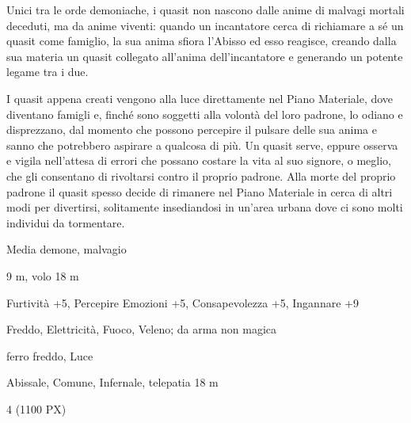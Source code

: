 \begin{multicols}{2}
{Unici tra le orde demoniache, i quasit non nascono dalle anime di malvagi mortali deceduti, ma da anime viventi: quando un incantatore cerca di richiamare a sé un quasit come famiglio, la sua anima sfiora l'Abisso ed esso reagisce, creando dalla sua materia un quasit collegato all'anima dell'incantatore e generando un potente legame tra i due.

I quasit appena creati vengono alla luce direttamente nel Piano Materiale, dove diventano famigli e, finché sono soggetti alla volontà del loro padrone, lo odiano e disprezzano, dal momento che possono percepire il pulsare delle sua anima e sanno che potrebbero aspirare a qualcosa di più. Un quasit serve, eppure osserva e vigila nell'attesa di errori che possano costare la vita al suo signore, o meglio, che gli consentano di rivoltarsi contro il proprio padrone. Alla morte del proprio padrone il quasit spesso decide di rimanere nel Piano Materiale in cerca di altri modi per divertirsi, solitamente insediandosi in un'area urbana dove ci sono molti individui da tormentare.

\begin{description}[noitemsep, topsep=0pt, parsep=0pt, partopsep=0pt, itemsep=1pt, leftmargin=2.35cm,  labelwidth=2.2cm, itemindent=0cm, listparindent=0pt] %
\setlength{\baselineskip}{10pt}
\item[\textbf{Taglia/Tipo}] Media demone, malvagio
\item[\textbf{Caratt.}] 
\item[\textbf{Punti Ferita}] 
\item[\textbf{Movimento}] 9 m, volo 18 m
\item[\textbf{Tiri Salvez.}] 
\item[\textbf{Comp.}] Furtività +5, Percepire Emozioni +5, Consapevolezza +5, Ingannare +9
\item[\textbf{Res. Danni}] Freddo, Elettricità, Fuoco, Veleno; da arma non magica
\item[\textbf{Sensi}] 
\item[\textbf{Vulnerabilità}] ferro freddo, Luce
\item[\textbf{Linguaggi}] Abissale, Comune, Infernale, telepatia 18 m
\item[\textbf{Sfida}] 4 (1100 PX)
\end{description}

}
\end{multicols}
